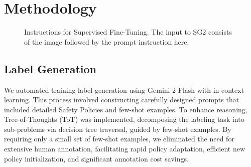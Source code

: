 \section{Methodology}
\label{sec:methodology}


\begin{figure}[t!]
        \noindent{}
\caption{Instructions for Supervised Fine-Tuning. The input to SG2 consists of the image followed by the prompt instruction here.}
\label{fig:sft_instruction}
\end{figure}

\subsection{Label Generation }\label{sec:labelgen}

We automated training label generation using Gemini 2 Flash \citep{gemini2Flash} with in-context learning. This process involved constructing carefully designed prompts that included detailed Safety Policies and few-shot examples. To enhance reasoning, Tree-of-Thoughts (ToT) \citep{yao2023tree} was implemented, decomposing the labeling task into sub-problems via decision tree traversal, guided by few-shot examples. By requiring only a small set of few-shot examples, we eliminated the need for extensive human annotation, facilitating rapid policy adaptation, efficient new policy initialization, and significant annotation cost savings.

